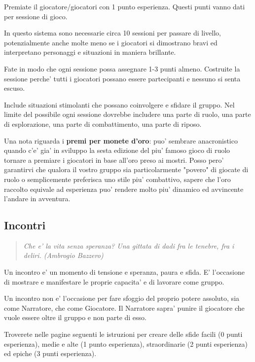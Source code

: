 \documentclass[a4paper,11pt,twoside,openany]{book}
\begin{document}
{		\bigskip
		
		Premiate il giocatore/giocatori con 1 punto esperienza. Questi punti vanno dati per sessione di gioco.
		
		In questo sistema sono necessarie circa 10 sessioni per passare di livello, potenzialmente anche molte meno se i giocatori si dimostrano bravi ed interpretano personaggi e situazioni in maniera brillante. 
		
		Fate in modo che ogni sessione possa assegnare 1-3 punti almeno. Costruite la sessione perche' tutti i giocatori possano essere partecipanti e nessuno si senta escuso.
		
		Include situazioni stimolanti che possano coinvolgere e sfidare il gruppo.
		Nel limite del possibile ogni sessione dovrebbe includere una parte di ruolo, una parte di esplorazione, una parte di combattimento, una parte di riposo.
		
		\bigskip
		
		Una nota riguarda i \textbf{premi per monete d'oro}: puo' sembrare anacronistico quando c'e' gia' in sviluppo la sesta edizione del piu' famoso gioco di ruolo tornare a premiare i giocatori in base all'oro preso ai mostri. Posso pero' garantirvi che qualora il vostro gruppo sia particolarmente "povero" di giocate di ruolo o semplicemente preferisca uno stile piu' combattivo, sapere che l'oro raccolto equivale ad esperienza puo' rendere molto piu' dinamico ed avvincente l'andare in avventura.
		
		\subsection{Incontri}
		
		
		\begin{quote}\textit{
				{Che e' la vita senza speranza? Una gittata di dadi fra le tenebre, fra i deliri. (Ambrogio Bazzero)}
		}\end{quote}
		
		\label{incontri}
		
		Un incontro e' un momento di tensione e speranza, paura e sfida. E' l'occasione di mostrare e manifestare le proprie capacita' e di lavorare come gruppo.
		
		Un incontro non e' l'occasione per fare sfoggio del proprio potere assoluto, sia come Narratore, che come Giocatore. Il Narratore sapra' punire il giocatore che vuole essere oltre il gruppo e non parte di esso.
		
		Troverete nelle pagine seguenti le istruzioni per creare delle sfide facili (0 punti esperienza), medie e alte (1 punto esperienza), straordinarie (2 punti esperienza) ed epiche (3 punti esperienza).
		
}
\end{document}
